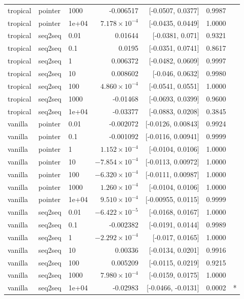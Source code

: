 \documentclass[10pt]{article}
\begin{document}
{\begin{longtable}{lllrrrl}
tropical & pointer & 1000 & -0.006517 & [-0.0507, 0.0377] & 0.9987 & \\
tropical & pointer & 1e+04 & $7.178\times10^{-4}$ & [-0.0435, 0.0449] & 1.0000 & \\
tropical & seq2seq & 0.01 & 0.01644 & [-0.0381, 0.071] & 0.9321 & \\
tropical & seq2seq & 0.1 & 0.0195 & [-0.0351, 0.0741] & 0.8617 & \\
tropical & seq2seq & 1 & 0.006372 & [-0.0482, 0.0609] & 0.9997 & \\
tropical & seq2seq & 10 & 0.008602 & [-0.046, 0.0632] & 0.9980 & \\
tropical & seq2seq & 100 & $4.860\times10^{-4}$ & [-0.0541, 0.0551] & 1.0000 & \\
tropical & seq2seq & 1000 & -0.01468 & [-0.0693, 0.0399] & 0.9600 & \\
tropical & seq2seq & 1e+04 & -0.03377 & [-0.0883, 0.0208] & 0.3845 & \\
vanilla & pointer & 0.01 & -0.002072 & [-0.0126, 0.00843] & 0.9924 & \\
vanilla & pointer & 0.1 & -0.001092 & [-0.0116, 0.00941] & 0.9999 & \\
vanilla & pointer & 1 & $1.152\times10^{-4}$ & [-0.0104, 0.0106] & 1.0000 & \\
vanilla & pointer & 10 & $-7.854\times10^{-4}$ & [-0.0113, 0.00972] & 1.0000 & \\
vanilla & pointer & 100 & $-6.320\times10^{-4}$ & [-0.0111, 0.00987] & 1.0000 & \\
vanilla & pointer & 1000 & $1.260\times10^{-4}$ & [-0.0104, 0.0106] & 1.0000 & \\
vanilla & pointer & 1e+04 & $9.510\times10^{-4}$ & [-0.00955, 0.0115] & 0.9999 & \\
vanilla & seq2seq & 0.01 & $-6.422\times10^{-5}$ & [-0.0168, 0.0167] & 1.0000 & \\
vanilla & seq2seq & 0.1 & -0.002382 & [-0.0191, 0.0144] & 0.9989 & \\
vanilla & seq2seq & 1 & $-2.292\times10^{-4}$ & [-0.017, 0.0165] & 1.0000 & \\
vanilla & seq2seq & 10 & 0.00336 & [-0.0134, 0.0201] & 0.9916 & \\
vanilla & seq2seq & 100 & 0.005209 & [-0.0115, 0.0219] & 0.9215 & \\
vanilla & seq2seq & 1000 & $7.980\times10^{-4}$ & [-0.0159, 0.0175] & 1.0000 & \\
vanilla & seq2seq & 1e+04 & -0.02983 & [-0.0466, -0.0131] & 0.0002 & *\\
\bottomrule
\end{longtable}
}
\end{document}
